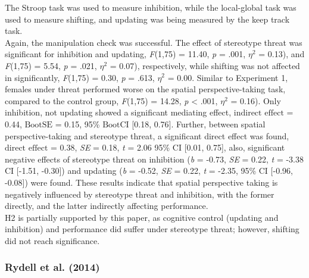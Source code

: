 \documentclass[
  stu,floatsintext]{apa7}
\begin{document}
The Stroop task was used to measure inhibition, while the local-global task was used to measure shifting, and updating was being measured by the keep track task.\\
Again, the manipulation check was successful.
The effect of stereotype threat was significant for inhibition and updating, \emph{F}(1,75) = 11.40, \emph{p} = .001, \(\eta^{2}\) = 0.13), and \emph{F}(1,75) = 5.54, \emph{p} = .021, \(\eta^{2}\) = 0.07), respectively, while shifting was not affected in significantly, \emph{F}(1,75) = 0.30, \emph{p} = .613, \(\eta^2\) = 0.00.
Similar to Experiment 1, females under threat performed worse on the spatial perspective-taking task, compared to the control group, \emph{F}(1,75) = 14.28, \emph{p} \textless{} .001, \(\eta^{2}\) = 0.16).
Only inhibition, not updating showed a significant mediating effect, \(\text{indirect effect}\) = 0.44, \(\text{BootSE}\) = 0.15, 95\% \(\text{BootCI}\) {[}0.18, 0.76{]}.
Further, between spatial perspective-taking and stereotype threat, a significant direct effect was found, \(\text{direct effect}\) = 0.38, \emph{SE} = 0.18, \emph{t} = 2.06 95\% \(\text{CI}\) {[}0.01, 0.75{]}, also, significant negative effects of stereotype threat on inhibition (\emph{b} = -0.73, \emph{SE} = 0.22, \emph{t} = -3.38 CI {[}-1.51, -0.30{]}) and updating (\emph{b} = -0.52, \emph{SE} = 0.22, \emph{t} = -2.35, 95\% CI {[}-0.96, -0.08{]}) were found.
These results indicate that spatial perspective taking is negatively influenced by stereotype threat and inhibition, with the former directly, and the latter indirectly affecting performance.\\
H2 is partially supported by this paper, as cognitive control (updating and inhibition) and performance did suffer under stereotype threat; however, shifting did not reach significance.

\subsubsection{Rydell et al. (2014)}\label{rydellstereotypethreatexecutive2014}
\end{document}
